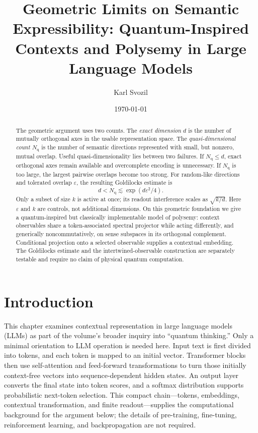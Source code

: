 \documentclass[
  aps,
  reprint,
  superscriptaddress,
  floatfix,
  nofootinbib,
  longbibliography
]{revtex4-2}
\newcommand{\Nq}{N_{\mathrm q}}
\begin{document}
\title{Geometric Limits on Semantic Expressibility: Quantum-Inspired Contexts and Polysemy in Large Language Models}

\author{Karl Svozil}

\date{\today}

\begin{abstract}
The geometric argument uses two counts.  The \emph{exact dimension} $d$ is
the number of mutually orthogonal axes in the usable representation space.
The \emph{quasi-dimensional count} $\Nq$ is the number of semantic directions
represented with small, but nonzero, mutual overlap.  Useful
quasi-dimensionality lies between two failures.  If $\Nq\leq d$, exact
orthogonal axes remain available and overcomplete encoding is unnecessary.
If $\Nq$ is too large, the largest pairwise overlaps become too strong.  For
random-like directions and tolerated overlap $\varepsilon$, the resulting
Goldilocks estimate is
\[
       d<\Nq\lesssim \exp(d\varepsilon^2/4).
\]
Only a subset of size $k$ is active at once; its readout interference scales
as $\sqrt{k/d}$.  Here $\varepsilon$ and $k$ are controls, not additional
dimensions.  On this geometric foundation we give a quantum-inspired but
classically implementable model of polysemy: context observables share a
token-associated spectral projector while acting differently, and generically
noncommutatively, on sense subspaces in its orthogonal complement. Conditional
projection onto a selected observable supplies a contextual embedding.  The
Goldilocks estimate and the intertwined-observable construction are separately
testable and require no claim of physical quantum computation.
\end{abstract}

\maketitle


\section{Introduction}
\label{sec:intro}

This chapter examines contextual representation in large language models
(LLMs) as part of the volume's broader inquiry into ``quantum thinking.''
Only a minimal orientation to LLM operation is needed here.  Input text is
first divided into tokens, and each token is mapped to an initial vector.
Transformer blocks then use self-attention and feed-forward transformations
to turn those initially context-free vectors into sequence-dependent hidden
states.  An output layer converts the final state into token scores, and a
softmax distribution supports probabilistic next-token selection.  This
compact chain---tokens, embeddings, contextual transformation, and finite
readout---supplies the computational background for the argument below; the
details of pre-training, fine-tuning, reinforcement learning, and
backpropagation are not required.
\end{document}
